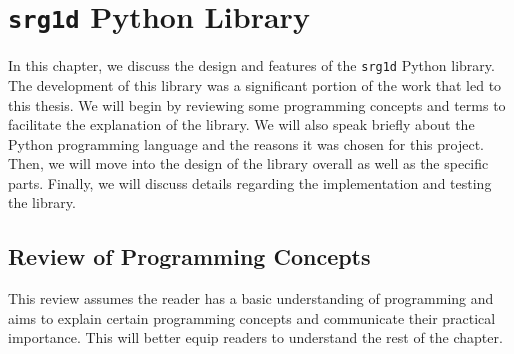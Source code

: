 \chapter{\texttt{srg1d} Python Library}

In this chapter, we discuss the design and features of the \texttt{srg1d} Python library. The development of this library was a significant portion of the work that led to this thesis. We will begin by reviewing some programming concepts and terms to facilitate the explanation of the library. We will also speak briefly about the Python programming language and the reasons it was chosen for this project. Then, we will move into the design of the library overall as well as the specific parts. Finally, we will discuss details regarding the implementation and testing the library.

\section{Review of Programming Concepts}

This review assumes the reader has a basic understanding of programming and aims to explain certain programming concepts and communicate their practical importance. This will better equip readers to understand the rest of the chapter.

